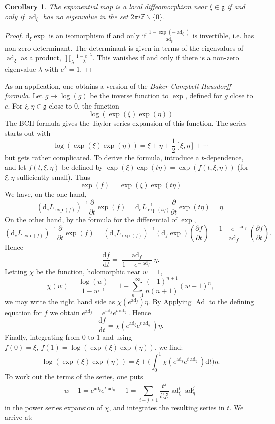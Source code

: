 \documentclass{article}
\newtheorem{corollary}[theorem]{Corollary}
\theoremstyle{remark}
\newcommand{\Z}{\mathbb{Z}}
\newcommand\lie[1]{\mathfrak{#1}}
\newcommand{\g}{\lie{g}}
\newcommand{\on}{\operatorname}
\newcommand{\Ad}{ \on{Ad} }
\newcommand{\ad}{ \on{ad} }
\renewcommand{\d}{{\mbox{d}}}
\newcommand{\f}{\frac}
\newcommand{\p}{\partial}
\newcommand{\hh}{{\textstyle \f{1}{2}}}
\begin{document}
%
\begin{corollary}
The exponential map is a local diffeomorphism near $\xi\in\g$ if and only if
$\ad_\xi$ has no eigenvalue in the set $2 \pi i \Z\backslash\{0\}$.
\end{corollary}
\begin{proof}
$\d_\xi\exp$ is an isomorphism if and only if $\f{1-\exp(-\ad_\xi)}{\ad_\xi}$ is invertible, i.e. has 
non-zero determinant. The determinant is given in terms of the eigenvalues of $\ad_\xi$ as a product, 
$\prod_{\lambda} \f{1-e^{-\lambda}}{\lambda}$. This vanishes if and only if there is a non-zero eigenvalue 
$\lambda$ with $e^\lambda=1$. 
\end{proof}

As an application, one obtains a version of the 
\emph{Baker-Campbell-Hausdorff formula}. 
%
Let $g\mapsto \log(g)$ be the inverse function to $\exp$, defined for $g$ close to $e$. 
For $\xi,\eta\in\g$ close to $0$, the function 
\[ \log(\exp(\xi)\exp(\eta))\] 
The BCH formula gives the Taylor series expansion of this function. 
The series starts out with 
\[ \log(\exp(\xi)\exp(\eta))=\xi+\eta+\hh [\xi,\eta]+\cdots\]
but gets rather complicated.  To derive the formula, introduce a $t$-dependence, and let 
$f(t,\xi,\eta)$ be defined by 
$\exp(\xi)\exp(t\eta)=\exp(f(t,\xi,\eta))$ (for $\xi,\eta$ sufficiently small). Thus 
\[ \exp(f)=\exp(\xi)\exp(t\eta)\]
We have, on the one hand, 
\[ (\d_eL_{\exp(f)})^{-1}\f{\p}{\p t}\exp(f)=
\d_e L_{\exp(t\eta)}^{-1}\f{\p}{\p t}\exp(t\eta)
=\eta.\]
On the other hand, by the formula for the differential of $\exp$, 
\[ (\d_eL_{\exp(f)})^{-1}\f{\p}{\p t}\exp(f)
=(\d_eL_{\exp(f)})^{-1}(\d_f\exp) (\f{\p f}{\p t})
= \f{1-e^{-\ad_f}}{\ad_f}(\f{\p f}{\p t}).\]
Hence 
%
\[ \f{\d f}{\d t}=\f{\ad_f}{1-e^{-\ad_f}}\eta.\]
%
Letting $\chi$ be the function, holomorphic near $w=1$,
%
\[ \chi(w)=\f{\log(w)}{1-w^{-1}}=1+\sum_{n=1}^\infty \f{(-1)^{n+1} }{n(n+1)}(w-1)^n,\] 
we may write the right hand side as $\chi(e^{\ad_f})\eta$. 
By Applying $\Ad$ 
to the defining equation for $f$ 
we obtain $e^{\ad_f}=e^{\ad_\xi}e^{t\ad_\eta}$. 
Hence 
%
\[ \f{\d f}{\d t}=\chi(e^{\ad_\xi}e^{t\ad_\eta}) \eta.\]
%
Finally, integrating from $0$ to $1$ and using $f(0)=\xi,\ f(1)=\log(\exp(\xi)\exp(\eta))$, we find:
%
\[ \log(\exp(\xi)\exp(\eta))=\xi+\Big(\int_0^1 \chi(e^{\ad_\xi}e^{t\ad_\eta})\d t\Big) \eta.\]
%
To work out the terms of the series, one puts 
\[ w-1=e^{\ad_\xi} e^{t\ad_\eta}-1=\sum_{i+j\ge 1} \f{t^j}{i! j!}\ad_\xi^i \ad_\eta^j \]
in the power series expansion of $\chi$, and integrates the resulting series in $t$. We arrive at: 
\end{document}
